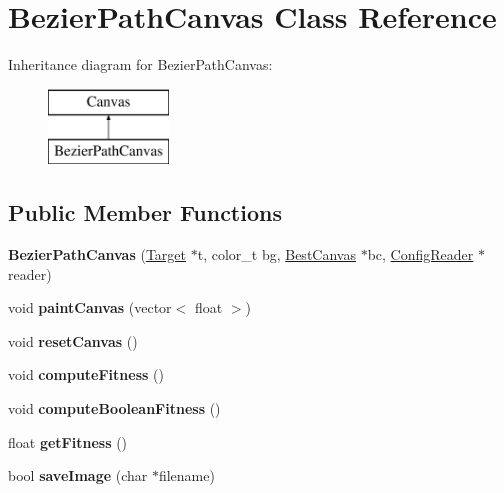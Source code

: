 \hypertarget{class_bezier_path_canvas}{\section{Bezier\-Path\-Canvas Class Reference}
\label{class_bezier_path_canvas}
}
Inheritance diagram for Bezier\-Path\-Canvas\-:\begin{figure}[H]
\begin{center}
\leavevmode
\includegraphics[height=2.000000cm]{class_bezier_path_canvas}
\end{center}
\end{figure}
\subsection*{Public Member Functions}
\begin{DoxyCompactItemize}
\item 
\hypertarget{class_bezier_path_canvas_ae24f243f5019dbd8fcab3312ffbf1188}{{\bfseries Bezier\-Path\-Canvas} (\hyperlink{class_target}{Target} $\ast$t, color\-\_\-t bg, \hyperlink{class_best_canvas}{Best\-Canvas} $\ast$bc, \hyperlink{class_config_reader}{Config\-Reader} $\ast$reader)}\label{class_bezier_path_canvas_ae24f243f5019dbd8fcab3312ffbf1188}

\item 
\hypertarget{class_bezier_path_canvas_a416fa47f6b5cdac2bfb97851da5d14f7}{void {\bfseries paint\-Canvas} (vector$<$ float $>$)}\label{class_bezier_path_canvas_a416fa47f6b5cdac2bfb97851da5d14f7}

\item 
\hypertarget{class_bezier_path_canvas_a9cbaaad5348b95398638c82e899603d6}{void {\bfseries reset\-Canvas} ()}\label{class_bezier_path_canvas_a9cbaaad5348b95398638c82e899603d6}

\item 
\hypertarget{class_bezier_path_canvas_a2262510eb3b0f95754b10c6baae55373}{void {\bfseries compute\-Fitness} ()}\label{class_bezier_path_canvas_a2262510eb3b0f95754b10c6baae55373}

\item 
\hypertarget{class_bezier_path_canvas_a5c875f0efc1936e6d87b32a4846ff890}{void {\bfseries compute\-Boolean\-Fitness} ()}\label{class_bezier_path_canvas_a5c875f0efc1936e6d87b32a4846ff890}

\item 
\hypertarget{class_bezier_path_canvas_a2baf50cc95bdf9a2de442ae38bb586fb}{float {\bfseries get\-Fitness} ()}\label{class_bezier_path_canvas_a2baf50cc95bdf9a2de442ae38bb586fb}

\item 
\hypertarget{class_bezier_path_canvas_a4f96f789b6ab895d3efb05fd6de199d6}{bool {\bfseries save\-Image} (char $\ast$filename)}\label{class_bezier_path_canvas_a4f96f789b6ab895d3efb05fd6de199d6}

\end{DoxyCompactItemize}
